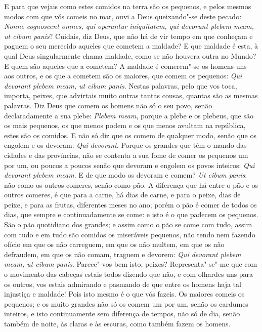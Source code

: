 E para que vejais como estes comidos na terra são os pequenos, e pelos
mesmos modos com que vós comeis no mar, ouvi a Deus queixando"-se deste
pecado: \emph{Nonne cognoscent omnes, qui operantur iniquitatem, qui
devorunt plebem meam, ut cibum panis}? Cuidais, diz Deus, que não há de
vir tempo em que
conheçam e paguem o seu merecido aqueles que cometem a maldade? E que
maldade é esta, à qual Deus singularmente chama maldade, como se não
houvera outra no Mundo? E quem são aqueles que a cometem? A maldade é
comerem"-se os homens uns aos outros, e os que a cometem são os maiores,
que comem os pequenos: \emph{Qui devorant plebem meam, ut cibum panis}.
Nestas palavras, pelo que vos toca, importa, peixes, que advirtais muito
outras tantas cousas, quantas são as mesmas palavras. Diz Deus que comem
os homens não só o seu povo, senão declaradamente a sua plebe:
\emph{Plebem meam}, porque a plebe e os plebeus, que são os mais
pequenos, os que menos podem e os que menos avultam na república, estes
são os comidos. E não só diz que os comem de qualquer modo, senão que os
engolem e os devoram: \emph{Qui devorant}. Porque os grandes que têm o
mando das cidades e das províncias, não se contenta a sua fome de comer
os pequenos um por um, ou poucos a poucos senão que devoram e engolem os
povos inteiros: \emph{Qui devorant plebem meam}. E de que modo os
devoram e comem? \emph{Ut cibum panis}: não como os outros comeres,
senão como pão.
A diferença que há entre o pão e os outros comeres, é que para a carne,
há dias de carne, e para o peixe, dias de peixe, e para as frutas,
diferentes meses no ano; porém o pão é comer de todos os dias, que
sempre e continuadamente se come: e isto é o que padecem os pequenos.
São o pão quotidiano dos grandes; e assim como o pão se come com tudo,
assim com tudo e em tudo são comidos os miseráveis pequenos, não tendo
nem fazendo ofício em que os não carreguem, em que os não multem, em que
os não defraudem, em que os não comam, traguem e devorem: \emph{Qui
devorant plebem meam, ut cibum panis}.
Parece"-vos bem isto, peixes? Representa"-se"-me que com o movimento das
cabeças estais todos dizendo que não, e com olhardes uns para os outros,
vos estais admirando e pasmando de que entre os homens haja tal
injustiça e maldade! Pois isto mesmo é o que vós fazeis. Os maiores
comeis os pequenos; e os muito grandes não só os comem um por um, senão
os cardumes inteiros, e isto continuamente sem diferença de tempos, não
só de dia, senão também de noite, às claras e às escuras, como também
fazem os homens.

